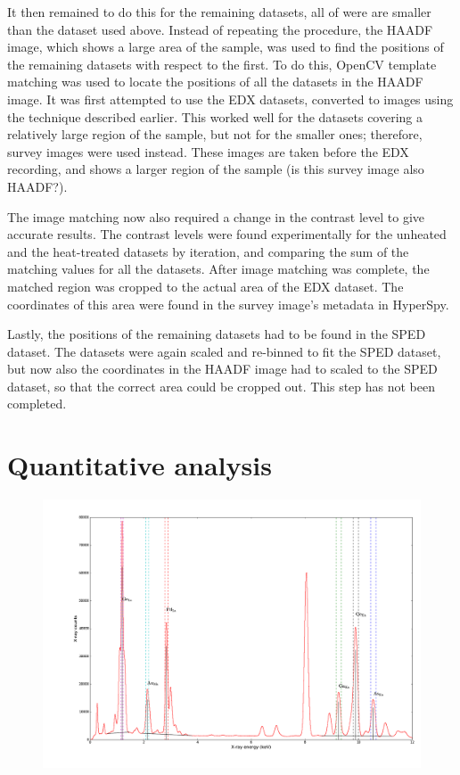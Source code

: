 It then remained to do this for the remaining datasets, all of were are smaller than the dataset used above. Instead of repeating the procedure, the HAADF image, which shows a large area of the sample, was used to find the positions of the remaining datasets with respect to the first. To do this, OpenCV template matching was used to locate the positions of all the datasets in the HAADF image. It was first attempted to use the EDX datasets, converted to images using the technique described earlier. This worked well for the datasets covering a relatively large region of the sample, but not for the smaller ones; therefore, survey images were used instead. These images are taken before the EDX recording, and shows a larger region of the sample (is this survey image also HAADF?).

The image matching now also required a change in the contrast level to give accurate results. The contrast levels were found experimentally for the unheated and the heat-treated datasets by iteration, and comparing the sum of the matching values for all the datasets. After image matching was complete, the matched region was cropped to the actual area of the EDX dataset. The coordinates of this area were found in the survey image's metadata in HyperSpy. 

Lastly, the positions of the remaining datasets had to be found in the SPED dataset. The datasets were again scaled and re-binned to fit the SPED dataset, but now also the coordinates in the HAADF image had to scaled to the SPED dataset, so that the correct area could be cropped out. This step has not been completed.

\section{Quantitative analysis}

\begin{figure}
	\centering
	\includegraphics[width=0.7\linewidth]{fig/other/UnheatedA-full-spectrum2}
	\caption{}
	\label{fig:spectrum-with-info}
\end{figure}

